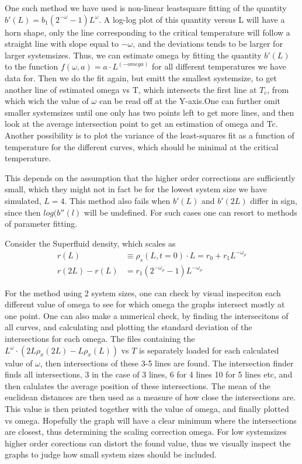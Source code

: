 One such method we have used is non-linear leastsquare fitting of the quantity $b'(L) = b_1(2^{-\omega} -1)L^{\omega}$.
A log-log plot of this quantity versus L will have a horn shape, only the line corresponding to the critical temperature will follow a straight line with slope equal to $-\omega$, and the deviations tends to be larger for larger systemsizes.
Thus, we can estimate omega by fitting the quantity $b'(L)$ to the function $f(\omega,a) = a\cdot L^(-omega)$ for all different temperatures we have data for. Then we do the fit again, but emitt the smallest systemsize, to get another line of estimated omega vs T, which intersects the first line at $T_c$, from which wich the value of $\omega$ can be read off at the Y-axis.One can further omit smaller systemsizes until one only has two points left to get more lines, and then look at the average intersection point to get an estimation of omega and Tc.
Another possibility is to plot the variance of the least-squares fit as a function of temperature for the different curves, which should be minimal at the critical temperature.

This depends on the assumption that the higher order corrections are sufficiently small, which they might not in fact be for the lowest system size we have simulated, $L=4$.
This method also fails when $b'(L)$ and $b'(2L)$ differ in sign, since then $log(b''(l)$ will be undefined.
For such cases one can resort to methods of parameter fitting.

Consider the Superfluid density, which scales as 
\begin{align}
  r(L)&\equiv \rho_s(L,t=0) \cdot L = r_0 + r_1L^{-\omega_\rho}\\
  r(2L) - r(L) &= r_1(2^{-\omega_\rho} -1)L^{-\omega_\rho}
\end{align}


For the method using 2 system sizes, one can check by visual inspeciton each different value of omega to see for which omega the graphs intersect mostly at one point. One can also make a numerical check, by finding the intersecitons of all curves, and calculating  and plotting the standard deviation of the intersections for each omega.
The files containing the $L^{\omega}\cdot (2L\rho_x(2L) - L\rho_x(L))$ vs $T$ is separately loaded for each calculated value of $\omega$, then intersections of these 3-5 lines are found. 
The intersection finder finds all intersections, 3 in the case of 3 lines, 6 for 4 lines 10 for 5 lines etc, and then calulates the average position of these intersections. The mean of the euclidean distances are then used as a measure of how close the intersections are. This value is then printed together with the value of omega, and finally plotted vs omega.
Hopefully the graph will have a clear minimum where the intersections are closest, thus determining the scaling correction omega.
For low systemsizes higher order corections can distort the found value, thus we visually inspect the graphs to judge how small system sizes should be included. 
